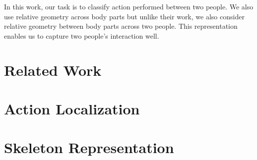\documentclass[10pt,twocolumn,letterpaper]{article}
\begin{document}
In this work, our task is to classify action performed between two people. We also use relative geometry across body parts but unlike their work, we also consider relative geometry between body parts across two people. This representation enables us to capture two people's interaction well.


\section{Related Work}

\section{Action Localization}


\section{Skeleton Representation}





%
\end{document}
